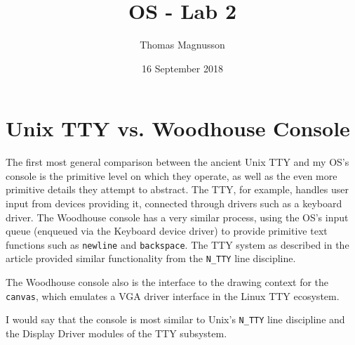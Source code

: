 \documentclass{article}
\title{OS - Lab 2}
\author{Thomas Magnusson }
\date{16 September 2018}
\begin{document}
\maketitle

\section{Unix TTY vs. Woodhouse Console}
The first most general comparison between the ancient Unix TTY and my OS's console is the primitive level on which they operate, as well as the even more primitive details they attempt to abstract. The TTY, for example, handles user input from devices providing it, connected through drivers such as a keyboard driver. The Woodhouse console has a very similar process, using the OS's input queue (enqueued via the Keyboard device driver) to provide primitive text functions such as \texttt{newline} and \texttt{backspace}. The TTY system as described in the article provided similar functionality from the \texttt{N\_TTY} line discipline.

The Woodhouse console also is the interface to the drawing context for the \texttt{canvas}, which emulates a VGA driver interface in the Linux TTY ecosystem.

I would say that the console is most similar to Unix's \texttt{N\_TTY} line discipline and the Display Driver modules of the TTY subsystem.
\end{document}
